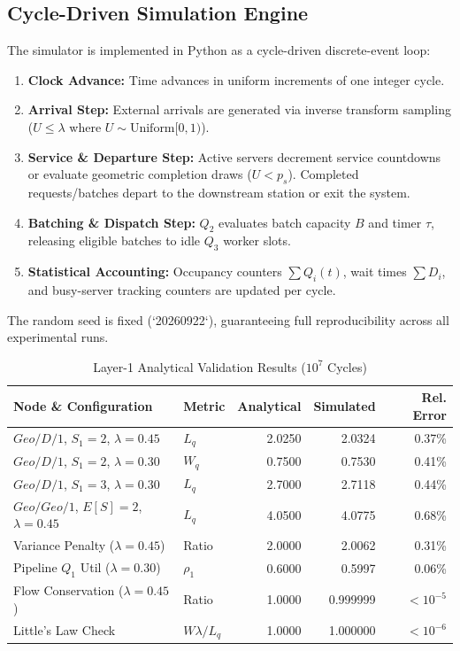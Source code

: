 \documentclass[conference]{IEEEtran}
\begin{document}
\subsection{Cycle-Driven Simulation Engine}
The simulator is implemented in Python as a cycle-driven discrete-event loop:
\begin{enumerate}
    \item \textbf{Clock Advance:} Time advances in uniform increments of one integer cycle.
    \item \textbf{Arrival Step:} External arrivals are generated via inverse transform sampling ($U \le \lambda$ where $U \sim \text{Uniform}[0, 1)$).
    \item \textbf{Service \& Departure Step:} Active servers decrement service countdowns or evaluate geometric completion draws ($U < p_s$). Completed requests/batches depart to the downstream station or exit the system.
    \item \textbf{Batching \& Dispatch Step:} $Q_2$ evaluates batch capacity $B$ and timer $\tau$, releasing eligible batches to idle $Q_3$ worker slots.
    \item \textbf{Statistical Accounting:} Occupancy counters $\sum Q_i(t)$, wait times $\sum D_i$, and busy-server tracking counters are updated per cycle.
\end{enumerate}
The random seed is fixed (`20260922`), guaranteeing full reproducibility across all experimental runs.

\begin{table}[t]
\centering
\caption{Layer-1 Analytical Validation Results ($10^7$ Cycles)}
\label{tab:validation}
\vspace{-0.1cm}
\scriptsize
\setlength{\tabcolsep}{2.5pt}
\begin{tabular}{@{}llrrr@{}}
\toprule
\textbf{Node \& Configuration} & \textbf{Metric} & \textbf{Analytical} & \textbf{Simulated} & \textbf{Rel. Error} \\
\midrule
$Geo/D/1$, $S_1{=}2$, $\lambda{=}0.45$ & $L_q$ & 2.0250 & 2.0324 & 0.37\% \\
$Geo/D/1$, $S_1{=}2$, $\lambda{=}0.30$ & $W_q$ & 0.7500 & 0.7530 & 0.41\% \\
$Geo/D/1$, $S_1{=}3$, $\lambda{=}0.30$ & $L_q$ & 2.7000 & 2.7118 & 0.44\% \\
$Geo/Geo/1$, $E[S]{=}2$, $\lambda{=}0.45$ & $L_q$ & 4.0500 & 4.0775 & 0.68\% \\
Variance Penalty ($\lambda{=}0.45$) & Ratio & 2.0000 & 2.0062 & 0.31\% \\
Pipeline $Q_1$ Util ($\lambda{=}0.30$) & $\rho_1$ & 0.6000 & 0.5997 & 0.06\% \\
Flow Conservation ($\lambda{=}0.45$) & Ratio & 1.0000 & 0.999999 & $<10^{-5}$ \\
Little's Law Check & $W \lambda / L_q$ & 1.0000 & 1.000000 & $<10^{-6}$ \\
\bottomrule
\end{tabular}
\vspace{-0.2cm}
\end{table}
\end{document}
